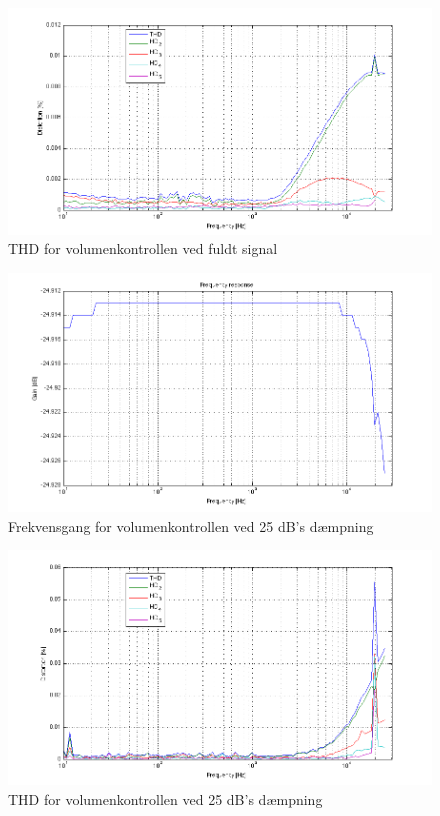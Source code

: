 \begin{figure}[h]
\centering
\includegraphics[width=\textwidth]{maalerapporter/volumenkontrol/2Vniveau0-thd.png}
\caption{THD for volumenkontrollen ved fuldt signal}
\end{figure}

\begin{figure}[h]
\centering
\includegraphics[width=\textwidth]{maalerapporter/volumenkontrol/2Vniveau25-frek.png}
\caption{Frekvensgang for volumenkontrollen ved 25 dB's dæmpning}
\end{figure}

\begin{figure}[h]
\centering
\includegraphics[width=\textwidth]{maalerapporter/volumenkontrol/2Vniveau25-thd.png}
\caption{THD for volumenkontrollen ved 25 dB's dæmpning}
\end{figure}

